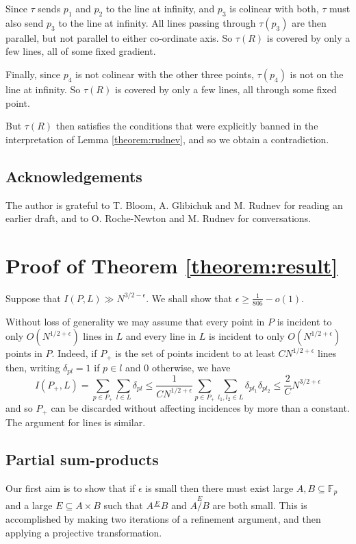 \documentclass[12pt]{article}
\begin{document}
Since $\tau$ sends $p_1$ and $p_2$ to the line at infinity, and $p_3$ is colinear with both, $\tau$ must also send $p_3$ to the line at infinity. All lines passing through $\tau(p_3)$ are then parallel, but not parallel to either co-ordinate axis. So $\tau(R)$ is covered by only a few lines, all of some fixed gradient. 

Finally, since $p_4$ is not colinear with the other three points, $\tau(p_4)$ is not on the line at infinity. So $\tau(R)$ is covered by only a few lines, all through some fixed point.

But $\tau(R)$ then satisfies the conditions that were explicitly banned in the interpretation of Lemma \ref{theorem:rudnev}, and so we obtain a contradiction.

\subsection*{Acknowledgements}
The author is grateful to T. Bloom, A. Glibichuk and M. Rudnev for reading an earlier draft, and to O. Roche-Newton and M. Rudnev for conversations.

\section{Proof of Theorem \ref{theorem:result}}

Suppose that $I(P,L)\gg N^{3/2-\epsilon}$. We shall show that $\epsilon\geq \frac{1}{806}-o(1)$.

Without loss of generality we may assume that every point in $P$ is incident to only $O(N^{1/2+\epsilon})$ lines in $L$ and every line in $L$ is incident to only $O(N^{1/2+\epsilon})$ points in $P$. Indeed, if $P_+$ is the set of points incident to at least $C N^{1/2+\epsilon}$ lines then, writing $\delta_{pl}=1$ if $p \in l$ and $0$ otherwise, we have
$$I(P_+,L)=\sum_{p \in P_+}\sum_{l \in L}\delta_{pl}\leq \frac{1}{CN^{1/2+\epsilon}}\sum_{p \in P_+}\sum_{l_1,l_2 \in L}\delta_{pl_1}\delta_{pl_2} \leq \frac{2}{C} N^{3/2+\epsilon}$$
and so $P_+$ can be discarded without affecting incidences by more than a constant. The argument for lines is similar.

\subsection{Partial sum-products}
Our first aim is to show that if $\epsilon$ is small then there must exist large $A,B \subseteq \mathbb{F}_p$ and a large $E \subseteq A \times B$ such that $A\stackrel{E}{-}B$ and $A\stackrel{E}{/}B$ are both small.
This is accomplished by making two iterations of a refinement argument, and then applying a projective transformation.
\end{document}
